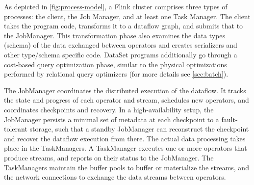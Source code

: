 \documentclass[11pt]{article}
\begin{document}
As depicted in \autoref{fig:process-model}, a Flink cluster comprises three types of processes: the client, the Job Manager, and at least one Task Manager. The client takes the program code, transforms it to a dataflow graph, and submits that to the JobManager. This transformation phase also examines the data types (schema) of the data exchanged between operators and creates serializers and other type/schema specific code. DataSet programs additionally go through a cost-based query optimization phase, similar to the physical optimizations performed by relational query optimizers (for more details see \autoref{sec:batch}).

The JobManager coordinates the distributed execution of the dataflow. It tracks the state and progress of each operator and stream, schedules new operators, and coordinates checkpoints and recovery. In a high-availability setup, the JobManager persists a minimal set of metadata at each checkpoint to a fault-tolerant storage, such that a standby JobManager can reconstruct the checkpoint and recover the dataflow execution from there. The actual data processing takes place in the TaskManagers. A TaskManager executes one or more operators that produce streams, and reports on their status to the JobManager. The TaskManagers maintain the buffer pools to buffer or materialize the streams, and the network connections to exchange the data streams between operators.
\end{document}
